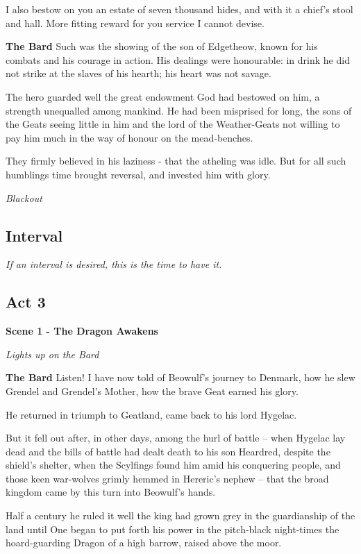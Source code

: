 \documentclass[a4paper]{article}
\begin{document}
{I also bestow on you an estate of seven thousand hides,
and with it a chief's stool and hall. 
More fitting reward for you service I cannot devise.

\textbf{The Bard} Such was the showing of the son of Edgetheow,
known for his combats and his courage in action.
His dealings were honourable: in drink he did not strike
at the slaves of his hearth; his heart was not savage.

The hero guarded well the great endowment
God had bestowed on him, a strength unequalled
among mankind. He had been misprised for long,
the sons of the Geats seeing little in him
and the lord of the Weather-Geats not willing to pay him
much in the way of honour on the mead-benches.

They firmly believed in his laziness - 
that the atheling was idle.
But for all such humblings
time brought reversal, and invested him with glory.

\centerline{\textit{Blackout}}

\subsection{Interval}%

\centerline{\textit{If an interval is desired, this is the time to have it.}}

\subsection{Act 3}%

\centerline{\textbf{Scene 1 - The Dragon Awakens}}
\centerline{\textit{Lights up on the Bard}}

\textbf{The Bard}  Listen!
I have now told of Beowulf's journey to Denmark,
how he slew Grendel and Grendel's Mother,
how the brave Geat earned his glory.

He returned in triumph to Geatland,
came back to his lord Hygelac.

But it fell out after, in other days,
among the hurl of battle – when Hygelac lay dead
and the bills of battle had dealt death to his son Heardred,
despite the shield’s shelter, when the Scylfings found him
amid his conquering people, and those keen war-wolves
grimly hemmed in Hereric’s nephew –
that the broad kingdom came by this turn
into Beowulf’s hands.

Half a century he ruled it well
the king had grown grey in the guardianship of the land 
until One began to put forth his power in the pitch-black night-times
the hoard-guarding Dragon of a high barrow, raised above the moor.

}
\end{document}
